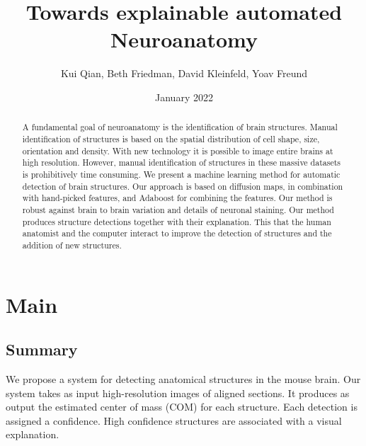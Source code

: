 \documentclass[runningheads]{llncs}
\title{Towards explainable automated Neuroanatomy}
\author{Kui Qian, Beth Friedman, David Kleinfeld, Yoav Freund}
\date{January 2022}
\begin{document}
\maketitle

\begin{abstract}
  A fundamental goal of neuroanatomy is the identification of brain
  structures.  Manual identification of structures is based on the
  spatial distribution of cell shape, size, orientation and density.
  With new technology it is possible to image entire brains at high
  resolution.  However, manual identification of structures in these
  massive datasets is prohibitively time consuming.  We present a
  machine learning method for automatic detection of brain
  structures. Our approach is based on diffusion maps, in combination
  with hand-picked features, and Adaboost for combining the
  features. Our method is robust against brain to brain variation and
  details of neuronal staining.  Our method produces structure
  detections together with their explanation. This that the human
  anatomist and the computer interact to improve the detection of
  structures and the addition of new structures.
  
\end{abstract}

\section{Main}
\subsection{Summary}
We propose a system for detecting anatomical structures in the mouse brain. Our system takes as input high-resolution images of aligned sections. It produces as output the estimated center of mass (COM) for each structure. Each detection is assigned a confidence. High confidence structures are associated with a visual explanation.
\end{document}
